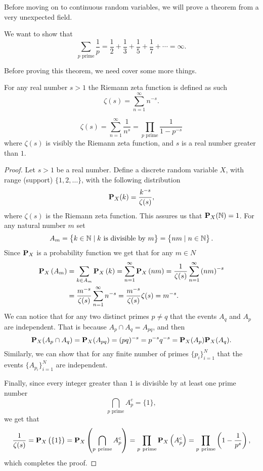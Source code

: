 \documentclass[11pt,a4paper]{article}
\begin{document}
  Before moving on to continuous random variables, we will prove a theorem
  from a very unexpected field.
  \begin{theorem}
    \label{thm:drp}
    We want to show that
    \[
      \sum _{p{\text{ prime}}}{\frac {1}{p}} =
      {\frac {1}{2}}+
      {\frac {1}{3}}+
      {\frac {1}{5}}+
      {\frac {1}{7}}+
      \cdots = \infty.
    \]
  \end{theorem}
  Before proving this theorem, we need cover some more things.
  \begin{definition}
    For any real number $s > 1$ the Riemann zeta function is defined
    as such
    \[
      \zeta(s) = \sum_{n=1}^{\infty} n^{-s}.
    \]
  \end{definition}
  \begin{lemma}\label{lem:epf}
    \[
      \zeta (s) =
      \sum _{n=1}^{\infty }{\frac {1}{n^{s}}} =
      \prod _{p{\text{ prime}}}{\frac {1}{1-p^{-s}}}
    \]
    where $\zeta(s)$ is visibly the Riemann zeta function, and $s$
    is a real number greater than $1$.
  \end{lemma}
  \begin{proof}
    Let $s > 1$ be a real number. Define a discrete random variable $X$,
    with range (support) $\{1,2,\dots\}$, with the following distribution
    \[
      \mathbf{P}_X(k) = \frac{k^{-s}}{\zeta(s)},
    \]
  where $\zeta(s)$ is the Riemann zeta function.
  This assures us that $\mathbf{P}_X(\mathbb{N}) = 1$. 
  For any natural number $m$ set
  \[
    A_m = 
    \set{k \in \mathbb{N}\mid \text{$k$ is divisible by $m$}} =
    \set{nm \mid n \in \mathbb{N}}.
  \]
  Since $\mathbf{P}_X$ is a probability function we get that for any $m \in N$
  \begin{align*}
    \mathbf{P}_{X}\left(A_{m}\right) 
    &= \sum_{k \in A_{m}} \mathbf{P}_{X}\left(k\right)
    = \sum_{n=1}^{\infty} \mathbf{P}_{X}\left(n m\right)
    = {\frac{1}{\zeta(s)}} \sum_{n=1}^{\infty} \left(n m\right)^{-s} \\
    &= {\frac{m^{-s}}{\zeta(s)}} \sum_{n=1}^{\infty} n^{-s}
    = {\frac{m^{-s}}{\zeta(s)}} \zeta(s)
    = m^{-s}.
  \end{align*}
  We can notice that for any two distinct primes $p \neq q$ that the events
  $A_q$ and $A_p$ are independent. That is because $A_p \cap A_q = A_{pq}$,
  and then
  \[
    \mathbf{P}_X(A_p \cap A_q) =
    \mathbf{P}_X(A_{pq}) =
    (pq)^{-s} =
    p^{-s} q^{-s} =
    \mathbf{P}_X(A_p) \mathbf{P}_X(A_q).
  \]
  Similarly, we can show that for any finite number of primes 
  $\{p_i\}_{i=1}^{N}$ that the events $\{A_{p_i}\}_{i=1}^{N}$ are independent.

  Finally, since every integer greater than $1$ is divisible by at least
  one prime number
  \[
    \bigcap_{p\text{ prime}} A_p^c = \{1\},
  \]
  we get that
  \[
    {\frac{1}{\zeta(s)}} = 
    \mathbf{P}_{X}\left(\left\{1\right\}\right) = 
    \mathbf{P}_{X}\left(\bigcap_{p \ \mathrm{prime}} A_{p}^{c}\right) = 
    \prod_{p \ \mathrm{prime}} \mathbf{P}_{X}\left(A_{p}^{c}\right) = 
    \prod_{p \ \mathrm{prime}} \left(1 - \frac{1}{p^{s}}\right),
  \]
  which completes the proof.
  \end{proof}
\end{document}
